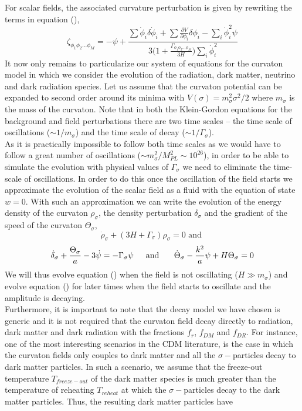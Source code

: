 \documentclass[11pt]{article}
\begin{document}
For scalar fields, the associated curvature perturbation is given by rewriting the terms in equation (), 
\begin{equation}
\zeta_{\phi_1 \phi_2 ... \phi_M} = -\psi + \frac{\sum \dot \phi_i \delta \dot \phi_i + \sum \frac{\partial V}{\partial \phi_i} \delta \phi_i - \sum_i \dot \phi_i^2 \psi}{3\bigg(1 +\frac{\Gamma_{\phi_1 \phi_2 ... \phi_M} }{3H} \bigg) \sum_i \dot \phi_i^2}
\end{equation}
\indent It now only remains to particularize our system of equations for the curvaton model in which we consider the evolution of the radiation, dark matter, neutrino and dark radiation species. Let us assume that the curvaton potential can be expanded to second order around its minima with $V(\sigma) = m_{\sigma}^2 \sigma^2/2$ where $m_{\sigma}$ is the mass of the curvaton. Note that in both the Klein-Gordon equations for the background and field perturbations there are two time scales -- the time scale of oscillations ($\sim 1/m_{\sigma}$) and the time scale of decay ($\sim 1/\Gamma_{\sigma}$).\\
\indent As it is practically impossible to follow both time scales as we would have to follow a great number of oscillations ($\sim m_{\sigma}^2/M_{PL}^2 \sim 10^{26} $), in order to be able to simulate the evolution with physical values of $\Gamma_{\sigma}$ we need to eliminate the time-scale of oscillations. In order to do this once the oscillation of the field starts we approximate the evolution of the scalar field as a fluid with the equation of state $w=0$. With such an approximation we can write the evolution of the energy density of the curvaton $\rho_{\sigma}$, the density perturbation $\delta_\sigma$ and the gradient of the speed of the curvaton $\Theta_\sigma$,
\begin{equation}
\dot \rho_{\sigma} + (3H + \Gamma_{\sigma})\rho_\sigma = 0 \mbox{ and }
\end{equation}
\begin{equation}
\dot \delta_{\sigma} +  \frac{\Theta_\sigma}a - 3 \dot \psi = -\Gamma_{\sigma} \psi \mbox{\indent and \indent} \dot \Theta_\sigma - \frac{k^2}{a} \psi + H \Theta_\sigma = 0
\end{equation}
\indent We will thus evolve equation () when the field is not oscillating ($H \gg m_\sigma$) and evolve equation () for later times when the field starts to oscillate and the amplitude is decaying. \\
\indent Furthermore, it is important to note that the decay model we have chosen is generic and it is not required that the curvaton field decay directly to radiation, dark matter and dark radiation with the fractions $f_{r}$, $f_{DM}$ and $f_{DR}$. For instance, one of the most interesting scenarios in the CDM literature, is the case in which the curvaton fields only couples to dark matter and all the $\sigma-$particles decay to dark matter particles. In such a scenario, we assume that the freeze-out temperature $T_{freeze-out}$ of the dark matter species is much greater than the temperature of reheating $T_{reheat}$ at which the $\sigma-$particles decay to the dark matter particles. Thus, the resulting dark matter particles have 
\end{document}
